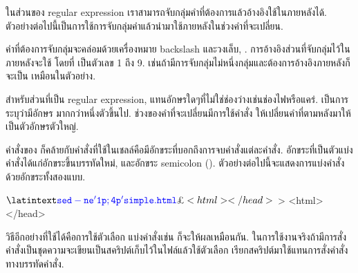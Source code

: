 \begin{thwbr}
ในส่วนของ regular expression เราสามารถจับกลุ่มคำที่ต้องการแล้วอ้างอิงใช้ในภายหลังได้. ตัวอย่างต่อไปนี้เป็นการใช้การจับกลุ่มคำแล้วนำมาใช้ภายหลังในช่วงคำที่จะเปลี่ยน.
\begin{MyExample}
\end{MyExample}%
คำที่ต้องการจับกลุ่มจะคล่อมด้วยเครื่องหมาย backslash และวงเล็บ, \cmd{\bs{}(\bs{})}. การอ้างอิงส่วนที่จับกลุ่มไว้ในภายหลังจะใช้  โดยที่  เป็นตัวเลข 1 ถึง 9. เช่นถ้ามีการจับกลุ่มไม่หนึ่งกลุ่มและต้องการอ้างอิงภายหลังก็จะเป็น  เหมือนในตัวอย่าง. 

สำหรับส่วนที่เป็น regular expression,  แทนอักษรใดๆที่ไม่ใช่ช่องว่างเช่นช่องไฟหรือแคร่. \cmd{+} เป็นการระบุว่ามีอักษร  มากกว่าหนึ่งตัวขึ้นไป. ช่วงของคำที่จะเปลี่ยนมีการใช้คำสั่ง  ให้เปลี่ยนคำที่ตามหลังมาให้เป็นตัวอักษรตัวใหญ่.

\medskip
คำสั่งของ  ก็คล้ายกับคำสั่งที่ใช้ในเชลล์คือมีอักขระที่บอกถึงการจบคำสั่งแต่ละคำสั่ง. อักขระที่เป็นตัวแบ่งคำสั่งได้แก่อักขระขึ้นบรรทัดใหม่, และอักขระ semicolon (\cmd{;}). ตัวอย่างต่อไปนี้จะแสดงการแบ่งคำสั่งด้วยอักขระทั้งสองแบบ.
\begin{MyExample}
\begin{MyEx}
$ 
<html>
</head>
$ 
> 
<html>
</head>
\end{MyEx}
\end{MyExample}

\medskip
วิธีอีกอย่างที่ใช้ได้คือการใช้ตัวเลือก  แบ่งคำสั่งเช่น  ก็จะให้ผลเหมือนกัน. ในการใช้งานจริงถ้ามีการสั่งคำสั่งเป็นชุดความจะเขียนเป็นสคริปต์เก็บไว้ในไฟล์แล้วใช้ตัวเลือก  เรียกสคริปต์มาใช้แทนการสั่งคำสั่ง  ทางบรรทัดคำสั่ง.


\end{thwbr}
